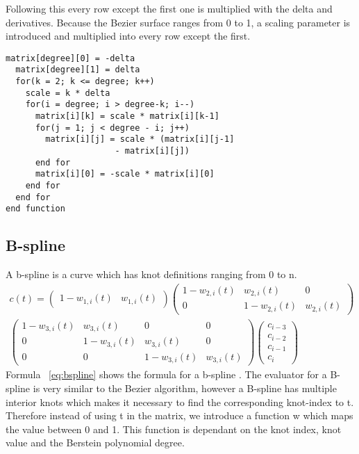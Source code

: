 \documentclass[a4paper,11pt]{article}
\begin{document}
Following this every row except the first one is multiplied with the delta and derivatives. Because the Bezier surface ranges from 0 to 1, a scaling parameter is introduced and multiplied into every row except the first. 

\label{fig:bezierEval2}
\begin{lstlisting}[frame=single, caption={Assigning the bottom half of the matrix}] 
  matrix[degree][0] = -delta
  matrix[degree][1] = delta
  for(k = 2; k <= degree; k++)
    scale = k * delta
    for(i = degree; i > degree-k; i--)
      matrix[i][k] = scale * matrix[i][k-1]
      for(j = 1; j < degree - i; j++)
        matrix[i][j] = scale * (matrix[i][j-1]
                      - matrix[i][j])
      end for
      matrix[i][0] = -scale * matrix[i][0]
    end for
  end for
end function
\end{lstlisting}

\subsection{B-spline}
A b-spline is a curve which has knot definitions ranging from 0 to n. 
\begin{multline} \label{eq:bspline}
c(t)=\begin{pmatrix}
1-w_{1,i}(t) & w_{1,i}(t)
\end{pmatrix}
\begin{pmatrix}
1-w_{2,i}(t) & w_{2,i}(t) & 0 \\ 
0 & 1-w_{2,i}(t) & w_{2,i}(t) 
\end{pmatrix}
\\
\begin{pmatrix}
1-w_{3,i}(t) & w_{3,i}(t) & 0 & 0\\ 
0 &  1-w_{3,i}(t) & w_{3,i}(t)  & 0 \\ 
0 & 0 &  1-w_{3,i}(t) & w_{3,i}(t) 
\end{pmatrix}
\begin{pmatrix}
c_{i-3}\\ 
c_{i-2}\\ 
c_{i-1}\\ 
c_{i}
\end{pmatrix}
\end{multline}
Formula ~\ref{eq:bspline} shows the formula for a b-spline \cite{art_ierbs}. The evaluator for a B-spline is very similar to the Bezier algorithm, however a B-spline has multiple interior knots which makes it necessary to find the corresponding knot-index to t. Therefore instead of using t in the matrix, we introduce a function w which maps the value between 0 and 1. This function is dependant on the knot index, knot value and the Berstein polynomial degree. 
\end{document}

